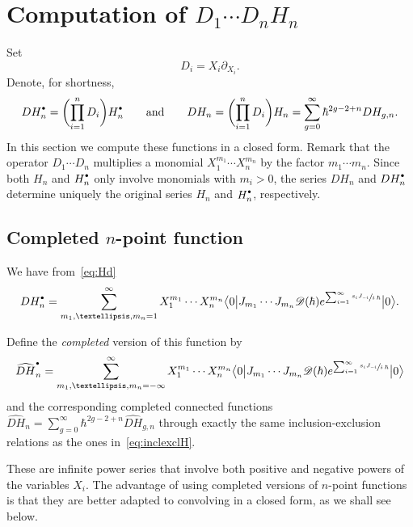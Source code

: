 \documentclass[11pt]{article}
\let\mathcal\mathscr
\newcommand{\sbullet}{{\scriptscriptstyle\bullet}}
\newcommand{\csbullet}{{\raisebox{1pt}{$\sbullet$}}}
\theoremstyle{plain}
\theoremstyle{definition}
\theoremstyle{remark}
\newcommand{\VEV}[1]{{\bigl\langle 0 \big| {#1} \big| 0 \bigr\rangle}}
\newcommand{\Hd}{H^\csbullet}
\begin{document}
\section{Computation of \texorpdfstring{$D_1\cdots D_n H_n$}{D1...DnHn}} \label{sec:CompDH}

Set
\begin{equation*}
D_i=X_i\partial_{X_i}.
\end{equation*}
Denote, for shortness,
\begin{equation*}
DH^\csbullet_n=\biggl(\prod_{i=1}^n D_i \biggr)\Hd_n\qquad \text{and} \qquad
DH_n= \biggl(\prod_{i=1}^n D_i \biggr)H_n
=\sum_{g=0}^\infty \hbar^{2g-2+n}DH_{g,n}.
\end{equation*}
In this section we compute these functions in a closed form. Remark that the operator $D_1\cdots D_n$ multiplies a monomial $X_1^{m_1}\cdots X_n^{m_n}$ by the factor $m_1\cdots m_n$. Since both $H_n$ and $\Hd_n$ only involve monomials with $m_i>0$, the series $DH_n$ and $D\Hd_n$ determine uniquely the original series $H_n$ and $\Hd_n$, respectively.

\subsection{Completed \texorpdfstring{$n$}{n}-point function}
We have from~\eqref{eq:Hd}
\begin{equation}\label{eq:DHd}
D\Hd_n=\sum_{m_1,\dots,m_n=1}^\infty X_1^{m_1}\cdots X_n^{m_n}
\VEV{J_{m_1}\cdots J_{m_n}\mathcal{D}(\hbar)e^{\sum_{i=1}^\infty \sfrac{s_iJ_{-i}}{i\,\hbar}}}.
\end{equation}

Define the \emph{completed} version of this function by
\begin{equation}\label{eq:cDHd}
\widehat{DH}^\csbullet_n=\sum_{m_1,\dots,m_n=-\infty}^\infty X_1^{m_1}\cdots X_n^{m_n}
\VEV{J_{m_1}\cdots J_{m_n}\mathcal{D}(\hbar)e^{\sum_{i=1}^\infty \sfrac{s_iJ_{-i}}{i\,\hbar}}}
\end{equation}
and the corresponding completed connected functions $\widehat{D H}_n=\sum_{g=0}^\infty \hbar^{2g-2+n}\widehat{D H}_{g,n}$ through exactly the same inclusion-exclusion relations as the ones in~\eqref{eq:inclexclH}.

These are infinite power series that involve both positive and negative powers of the variables $X_i$. The advantage of using completed versions of $n$-point functions is that they are better adapted to convolving in a closed form, as we shall see below.
\end{document}

